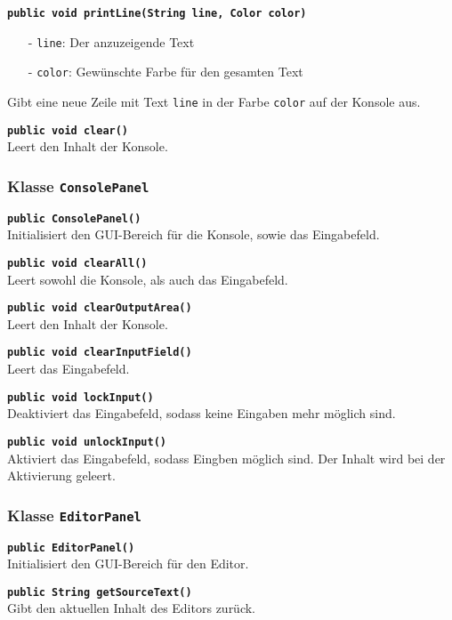 \documentclass[parskip=full,11pt,twoside]{scrartcl}
\begin{document}
\textbf{\texttt{public void printLine(String line, Color color)}}
\begin{itemize}[noitemsep]
	\item[-] \texttt{line}: Der anzuzeigende Text
	\item[-] \texttt{color}: Gewünschte Farbe für den gesamten Text
\end{itemize}
Gibt eine neue Zeile mit Text \texttt{line} in der Farbe \texttt{color} auf der Konsole aus.

\textbf{\texttt{public void clear()}}\\
Leert den Inhalt der Konsole.

\subsubsection{Klasse \texttt{ConsolePanel}}

\textbf{\texttt{public ConsolePanel()}}\\
Initialisiert den GUI-Bereich für die Konsole, sowie das Eingabefeld.

\textbf{\texttt{public void clearAll()}}\\
Leert sowohl die Konsole, als auch das Eingabefeld.

\textbf{\texttt{public void clearOutputArea()}}\\
Leert den Inhalt der Konsole.

\textbf{\texttt{public void clearInputField()}}\\
Leert das Eingabefeld.

\textbf{\texttt{public void lockInput()}}\\
Deaktiviert das Eingabefeld, sodass keine Eingaben mehr möglich sind.

\textbf{\texttt{public void unlockInput()}}\\
Aktiviert das Eingabefeld, sodass Eingben möglich sind. Der Inhalt wird bei der Aktivierung geleert.

\subsubsection{Klasse \texttt{EditorPanel}}

\textbf{\texttt{public EditorPanel()}}\\
Initialisiert den GUI-Bereich für den Editor.

\textbf{\texttt{public String getSourceText()}}\\
Gibt den aktuellen Inhalt des Editors zurück.
\end{document}
